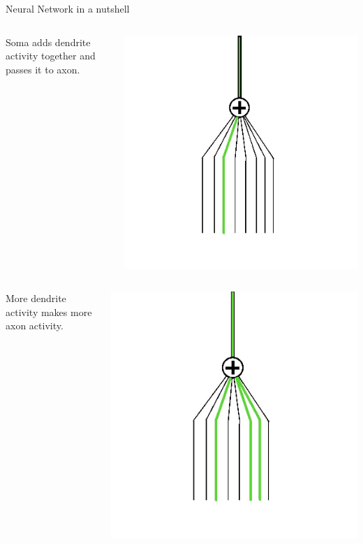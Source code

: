 \documentclass[10pt]{beamer}
\begin{document}
	\begin{frame}[t]{Neural Network in a nutshell}
		\begin{columns}
				\begin{column}{0.5\textwidth}
					\begin{center}
						\large{Soma adds dendrite activity together and passes it to axon.}
					\end{center}
				\end{column}
				\begin{column}{0.5\textwidth}
					\begin{center}
						\includegraphics[width=0.7\linewidth]{images/sonn1}
					\end{center}
				\end{column}
		\end{columns}
		\begin{columns}
				\begin{column}{0.5\textwidth}
					\begin{center}
						\large{More dendrite activity makes more axon activity.}
					\end{center}
				\end{column}
				\begin{column}{0.5\textwidth}
					\begin{center}
						\includegraphics[width=0.7\linewidth]{images/sonn2}
					\end{center}
				\end{column}
		\end{columns}
	\end{frame}
\end{document}
